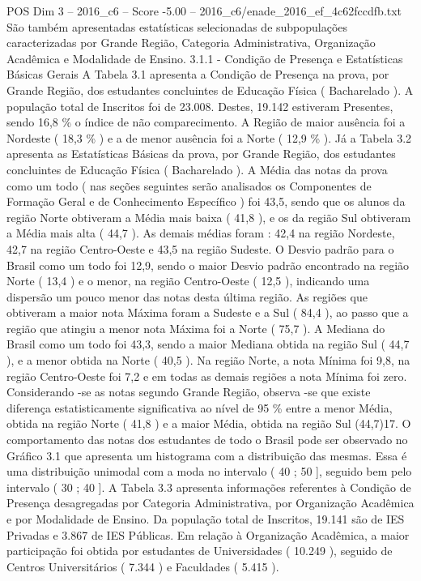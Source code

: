 \begin{textsample}{POS Dim 3 – 2016\_c6 – Score -5.00 – 2016\_c6/enade\_2016\_ef\_4c62fccdfb.txt}
São também apresentadas estatísticas selecionadas de subpopulações caracterizadas por Grande Região, Categoria Administrativa, Organização Acadêmica e Modalidade de Ensino. 3.1.1 - Condição de Presença e Estatísticas Básicas Gerais A Tabela 3.1 apresenta a Condição de Presença na prova, por Grande Região, dos estudantes concluintes de Educação Física ( Bacharelado ).
A população total de Inscritos foi de 23.008.
Destes, 19.142 estiveram Presentes, sendo 16,8 \% o índice de não comparecimento.
A Região de maior ausência foi a Nordeste ( 18,3 \% ) e a de menor ausência foi a Norte ( 12,9 \% ).
Já a Tabela 3.2 apresenta as Estatísticas Básicas da prova, por Grande Região, dos estudantes concluintes de Educação Física ( Bacharelado ).
A Média das notas da prova como um todo ( nas seções seguintes serão analisados os Componentes de Formação Geral e de Conhecimento Específico ) foi 43,5, sendo que os alunos da região Norte obtiveram a Média mais baixa ( 41,8 ), e os da região Sul obtiveram a Média mais alta ( 44,7 ).
As demais médias foram : 42,4 na região Nordeste, 42,7 na região Centro-Oeste e 43,5 na região Sudeste.
O Desvio padrão para o Brasil como um todo foi 12,9, sendo o maior Desvio padrão encontrado na região Norte ( 13,4 ) e o menor, na região Centro-Oeste ( 12,5 ), indicando uma dispersão um pouco menor das notas desta última região.
As regiões que obtiveram a maior nota Máxima foram a Sudeste e a Sul ( 84,4 ), ao passo que a região que atingiu a menor nota Máxima foi a Norte ( 75,7 ).
A Mediana do Brasil como um todo foi 43,3, sendo a maior Mediana obtida na região Sul ( 44,7 ), e a menor obtida na Norte ( 40,5 ).
Na região Norte, a nota Mínima foi 9,8, na região Centro-Oeste foi 7,2 e em todas as demais regiões a nota Mínima foi zero.
Considerando -se as notas segundo Grande Região, observa -se que existe diferença estatisticamente significativa ao nível de 95 \% entre a menor Média, obtida na região Norte ( 41,8 ) e a maior Média, obtida na região Sul (44,7)17.
O comportamento das notas dos estudantes de todo o Brasil pode ser observado no Gráfico 3.1 que apresenta um histograma com a distribuição das mesmas.
Essa é uma distribuição unimodal com a moda no intervalo ( 40 ; 50 ], seguido bem pelo intervalo ( 30 ; 40 ].
A Tabela 3.3 apresenta informações referentes à Condição de Presença desagregadas por Categoria Administrativa, por Organização Acadêmica e por Modalidade de Ensino.
Da população total de Inscritos, 19.141 são de IES Privadas e 3.867 de IES Públicas.
Em relação à Organização Acadêmica, a maior participação foi obtida por estudantes de Universidades ( 10.249 ), seguido de Centros Universitários ( 7.344 ) e Faculdades ( 5.415 ).

\end{textsample}
